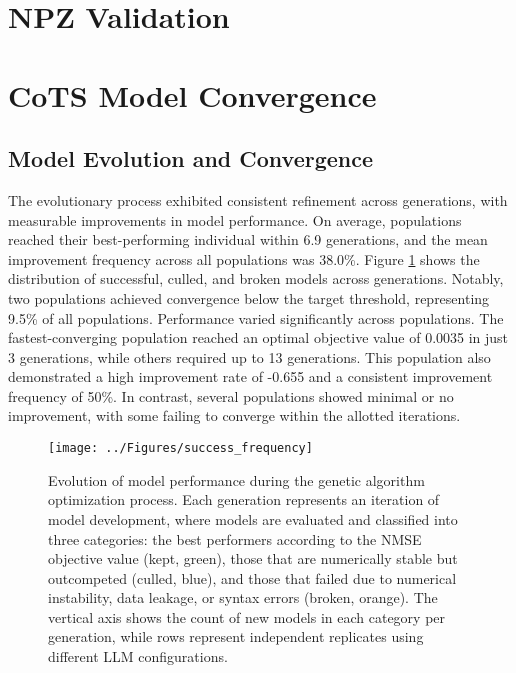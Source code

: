 \section{NPZ Validation}
\label{sec:npz_validation}



\section{CoTS Model Convergence}
\label{sec:convergence}
    
\subsection{Model Evolution and Convergence}
The evolutionary process exhibited consistent refinement across generations, with measurable improvements in model performance. On average, populations reached their best-performing individual within 6.9 generations, and the mean improvement frequency across all populations was 38.0\%. Figure \ref{fig:status_distribution} shows the distribution of successful, culled, and broken models across generations. Notably, two populations achieved convergence below the target threshold, representing 9.5\% of all populations.
Performance varied significantly across populations. The fastest-converging population reached an optimal objective value of 0.0035 in just 3 generations, while others required up to 13 generations. This population also demonstrated a high improvement rate of -0.655 and a consistent improvement frequency of 50\%. In contrast, several populations showed minimal or no improvement, with some failing to converge within the allotted iterations.
\begin{figure}[H]
\centering
\texttt{[image: ../Figures/success\_frequency]}
\caption{Evolution of model performance during the genetic algorithm optimization process. Each generation represents an iteration of model development, where models are evaluated and classified into three categories: the best performers according to the NMSE objective value (kept, green), those that are numerically stable but outcompeted (culled, blue), and those that failed due to numerical instability, data leakage, or syntax errors (broken, orange). The vertical axis shows the count of new models in each category per generation, while rows represent independent replicates using different LLM configurations.}
\label{fig:status_distribution}
\end{figure}

